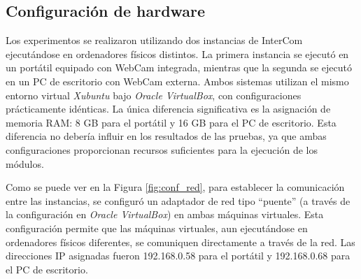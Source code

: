 \label{sec:resultados_y_discusion}

\subsection{Configuración de hardware}

Los experimentos se realizaron utilizando dos instancias de InterCom ejecutándose en ordenadores físicos distintos. La primera instancia se ejecutó en un portátil equipado con WebCam integrada, mientras que la segunda se ejecutó en un PC de escritorio con WebCam externa. Ambos sistemas utilizan el mismo entorno virtual \textit{Xubuntu} bajo \textit{Oracle VirtualBox}, con configuraciones prácticamente idénticas. La única diferencia significativa es la asignación de memoria RAM: 8 GB para el portátil y 16 GB para el PC de escritorio. Esta diferencia no debería influir en los resultados de las pruebas, ya que ambas configuraciones proporcionan recursos suficientes para la ejecución de los módulos.
\vspace{\baselineskip}

Como se puede ver en la Figura \ref{fig:conf_red}, para establecer la comunicación entre las instancias, se configuró un adaptador de red tipo ``puente'' (a través de la configuración en \textit{Oracle VirtualBox}) en ambas máquinas virtuales. Esta configuración permite que las máquinas virtuales, aun ejecutándose en ordenadores físicos diferentes, se comuniquen directamente a través de la red. Las direcciones IP asignadas fueron 192.168.0.58 para el portátil y 192.168.0.68 para el PC de escritorio.

